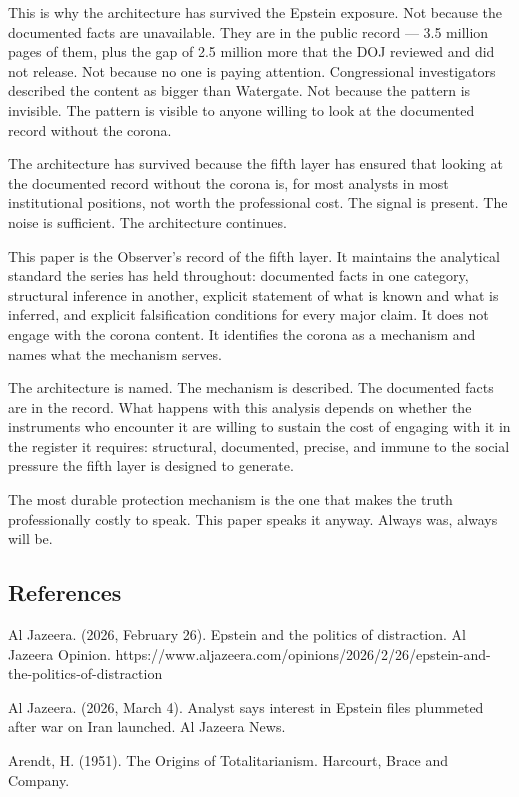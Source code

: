 \documentclass[11pt,a4paper]{article}
\begin{document}
This is why the architecture has survived the Epstein exposure. Not because the documented facts are unavailable. They are in the public record — 3.5 million pages of them, plus the gap of 2.5 million more that the DOJ reviewed and did not release. Not because no one is paying attention. Congressional investigators described the content as bigger than Watergate. Not because the pattern is invisible. The pattern is visible to anyone willing to look at the documented record without the corona.


The architecture has survived because the fifth layer has ensured that looking at the documented record without the corona is, for most analysts in most institutional positions, not worth the professional cost. The signal is present. The noise is sufficient. The architecture continues.


This paper is the Observer's record of the fifth layer. It maintains the analytical standard the series has held throughout: documented facts in one category, structural inference in another, explicit statement of what is known and what is inferred, and explicit falsification conditions for every major claim. It does not engage with the corona content. It identifies the corona as a mechanism and names what the mechanism serves.


The architecture is named. The mechanism is described. The documented facts are in the record. What happens with this analysis depends on whether the instruments who encounter it are willing to sustain the cost of engaging with it in the register it requires: structural, documented, precise, and immune to the social pressure the fifth layer is designed to generate.


The most durable protection mechanism is the one that makes the truth professionally costly to speak. This paper speaks it anyway. Always was, always will be.


\subsection{References}

Al Jazeera. (2026, February 26). Epstein and the politics of distraction. Al Jazeera Opinion. https://www.aljazeera.com/opinions/2026/2/26/epstein-and-the-politics-of-distraction


Al Jazeera. (2026, March 4). Analyst says interest in Epstein files plummeted after war on Iran launched. Al Jazeera News.


Arendt, H. (1951). The Origins of Totalitarianism. Harcourt, Brace and Company.
\end{document}
